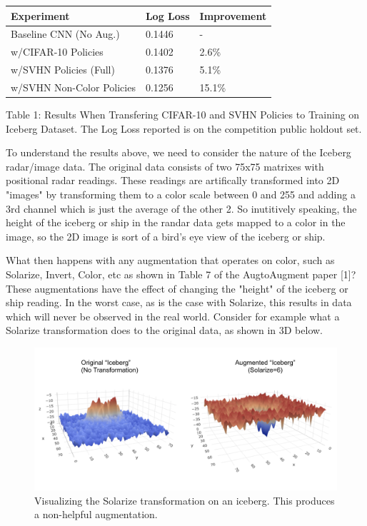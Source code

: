 \documentclass[10pt,twocolumn,letterpaper]{article}
\begin{document}
    \begin{table}[h]
      \begin{tabular}{lll}
        \hline
        Experiment &Log Loss & Improvement   \\ \hline
        Baseline CNN (No Aug.)  &0.1446 &-\\
        w/CIFAR-10 Policies &0.1402  & 2.6\%\\ 
        w/SVHN Policies (Full) &0.1376  & 5.1\%\\
        w/SVHN Non-Color Policies &0.1256  &15.1\%\\  
        \hline
      \end{tabular}
    \end{table}

Table 1: Results When Transfering CIFAR-10 and SVHN Policies to Training on Iceberg Dataset.  The Log Loss reported is on the competition public holdout set.

To understand the results above, we need to consider the nature of the Iceberg radar/image data.  The original data consists of two 75x75 matrixes with positional radar readings.  These readings are artifically transformed into 2D "images" by transforming them to a color scale between 0 and 255 and adding a 3rd channel which is just the average of the other 2.  So inutitively speaking, the height of the iceberg or ship in the randar data gets mapped to a color in the image, so the 2D image is sort of a bird's eye view of the iceberg or ship.

What then happens with any augmentation that operates on color, such as Solarize, Invert, Color, etc as shown in Table 7 of the AugtoAugment paper [1]?  These augmentations have the effect of changing the "height" of the iceberg or ship reading.  In the worst case, as is the case with Solarize, this results in data which will never be observed in the real world.  Consider for example what a Solarize transformation does to the original data, as shown in 3D below.


\begin{figure}[bhp]
\includegraphics[width=\columnwidth]{iceberg_solarize.png}
\caption{Visualizing the Solarize transformation on an iceberg. This produces a non-helpful augmentation.}
\end{figure}
\end{document}
